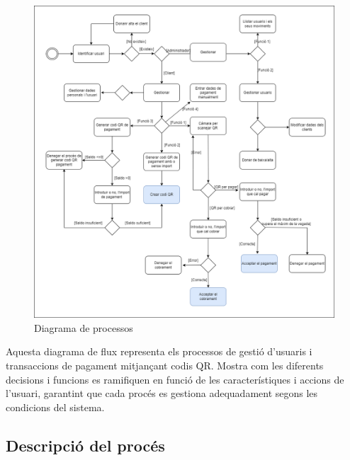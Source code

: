 \documentclass[a4paper,12pt,twoside]{ThesisStyle}
\begin{document}
\begin{figure}[h]
    \centering
    \includegraphics[width=1\textwidth]{imatges/diagrama processos.png}
    \caption{ Diagrama de processos }
    \label{fig: Diagrama de processos }
\end{figure}

Aquesta diagrama de flux representa els processos de gestió d'usuaris i transaccions de pagament mitjançant codis QR. Mostra com les diferents decisions i funcions es ramifiquen en funció de les característiques i accions de l'usuari, garantint que cada procés es gestiona adequadament segons les condicions del sistema.


\subsection{Descripció del procés}
\label{subsec:Descripció del procés}
\end{document}
